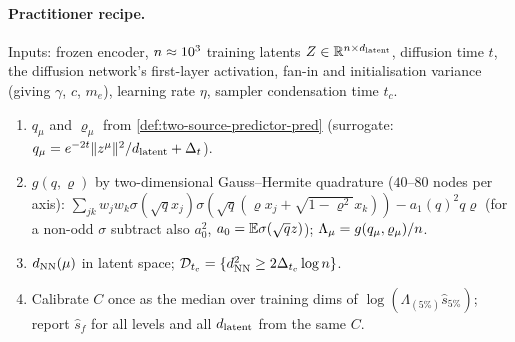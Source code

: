 \paragraph{Practitioner recipe.}
Inputs: frozen encoder, $n\approx10^3$ training latents $Z\in\mathbb{R}^{n\times d_{\mathrm{latent}}}$, diffusion time $t$, the diffusion network's first-layer activation, fan-in and initialisation variance (giving $\gamma$, $c$, $m_e$), learning rate $\eta$, sampler condensation time $t_c$.
\begin{enumerate}
\item $q_\mu$ and $\varrho_\mu$ from \cref{def:two-source-predictor-pred} (surrogate: $q_\mu=e^{-2t}\|z^\mu\|^2/d_{\mathrm{latent}}+\Delta_t$).
\item $g(q,\varrho)$ by two-dimensional Gauss--Hermite quadrature ($40$--$80$ nodes per axis): $\sum_{jk}w_jw_k\sigma(\sqrt q x_j)\sigma(\sqrt q(\varrho x_j+\sqrt{1-\varrho^2}x_k))-a_1(q)^2q\varrho$ (for a non-odd $\sigma$ subtract also $a_0^2$, $a_0=\mathbb{E}\sigma(\sqrt qz)$); $\Lambda_\mu=g(q_\mu,\varrho_\mu)/n$.
\item $d_{\rm NN}(\mu)$ in latent space; $\mathcal D_{t_c}=\{d_{\rm NN}^2\ge2\Delta_{t_c}\log n\}$.
\item Calibrate $C$ once as the median over training dims of $\log(\Lambda_{(5\%)}\hat s_{5\%})$; report $\hat s_f$ for all levels and all $d_{\mathrm{latent}}$ from the same $C$.
\end{enumerate}

